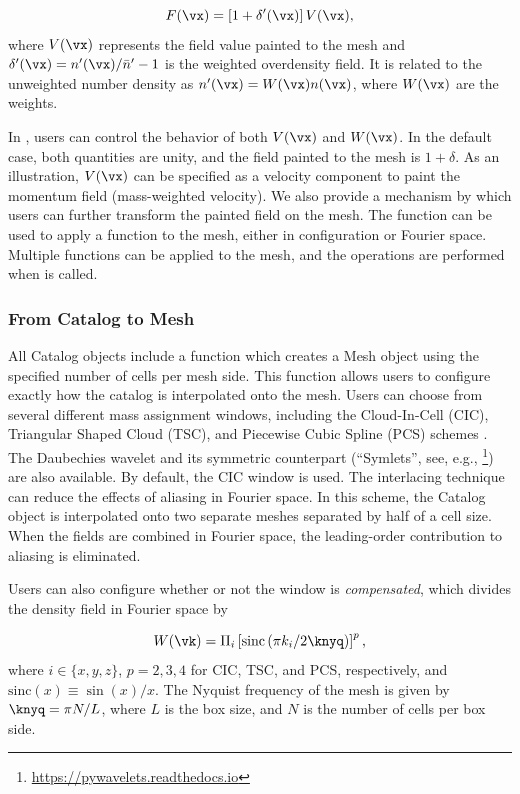 \begin{equation}
   F(\vx) = \left[ 1 + \delta'(\vx) \right] V(\vx),
\end{equation}
where $V(\vx)$ represents the field value painted to the mesh and
$\delta'(\vx) =  n'(\vx)/\bar{n}' - 1$ is the weighted overdensity field.
It is related to the unweighted number density as $n'(\vx) = W(\vx) n(\vx)$,
where $W(\vx)$ are the weights.

In \nbkit{}, users can control the
behavior of both $V(\vx)$ and $W(\vx)$. In the default case, both quantities
are unity, and the field painted to the mesh is $1 + \delta$. As an
illustration, $V(\vx)$ can be specified as a velocity component to paint the
momentum field (mass-weighted velocity).
We also provide a mechanism by which users can further transform the painted
field on the mesh. The  function can be used to apply
a function to the mesh, either in configuration or Fourier space. Multiple
functions can be applied to the mesh, and the operations are performed when
 is called.

\subsubsection{From Catalog to Mesh}

All Catalog objects include a  function which creates a
Mesh object using the specified number of cells per mesh side. This function
allows users to configure exactly how the catalog is interpolated
onto the mesh. Users can choose from several different mass assignment
windows, including the Cloud-In-Cell (CIC), Triangular Shaped Cloud (TSC),
and Piecewise Cubic Spline (PCS) schemes
\citep{Hockney:1981}. The Daubechies wavelet \citep{Daubechies:1992} and its
symmetric counterpart (``Symlets'', see, e.g.,
\footnote{\url{https://pywavelets.readthedocs.io}})
are also available. By default, the CIC window is
used. The interlacing technique \citep{Hockney:1981,Sefusatti:2016}
can reduce the effects of aliasing in Fourier space. In this scheme, the
Catalog object is interpolated onto
two separate meshes separated by half of a cell size. When the fields are
combined in Fourier space, the leading-order
contribution to aliasing is eliminated.

Users can also configure whether or not the window is \textit{compensated},
which divides the density field in Fourier space by \citep{Hockney:1981}

\begin{equation}\label{eq:window-deconvolution}
W(\vk) = \Pi_i \left[\mathrm{sinc}\left(\pi k_i/2\knyq\right) \right]^p,
\end{equation}
where $i \in \{x,y,z\}$, $p=2,3,4$ for CIC, TSC, and PCS, respectively,
and $\mathrm{sinc}(x) \equiv \sin(x)/x$. The Nyquist frequency of the
mesh is given by $\knyq = \pi N / L$, where $L$ is the
box size, and $N$ is the number of cells per box side.

